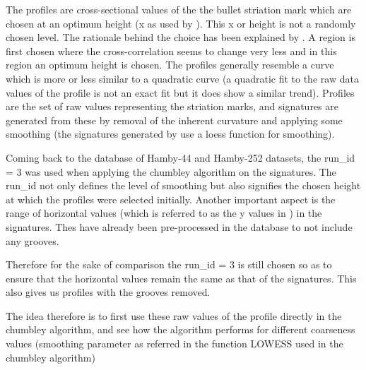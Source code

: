 \documentclass[12pt]{article}
\begin{document}
The profiles are cross-sectional values of the the bullet striation mark
which are chosen at an optimum height (x as used by \citet{aoas}). This
x or height is not a randomly chosen level. The rationale behind the
choice has been explained by \citet{aoas}. A region is first chosen
where the cross-correlation seems to change very less and in this region
an optimum height is chosen. The profiles generally resemble a curve
which is more or less similar to a quadratic curve (a quadratic fit to
the raw data values of the profile is not an exact fit but it does show
a similar trend). Profiles are the set of raw values representing the
striation marks, and signatures are generated from these by removal of
the inherent curvature and applying some smoothing (the signatures
generated by \citet{aoas} use a loess function for smoothing).

Coming back to the database of Hamby-44 and Hamby-252 datasets, the
run\_id = 3 was used when applying the chumbley algorithm on the
signatures. The run\_id not only defines the level of smoothing but also
signifies the chosen height at which the profiles were selected
initially. Another important aspect is the range of horizontal values
(which is referred to as the y values in \citet{aoas}) in the
signatures. Thes have already been pre-processed in the database to not
include any grooves.

Therefore for the sake of comparison the run\_id = 3 is still chosen so
as to ensure that the horizontal values remain the same as that of the
signatures. This also gives us profiles with the grooves removed.

The idea therefore is to first use these raw values of the profile
directly in the chumbley algorithm, and see how the algorithm performs
for different coarseness values (smoothing parameter as referred in the
function LOWESS used in the chumbley algorithm)



\end{document}
